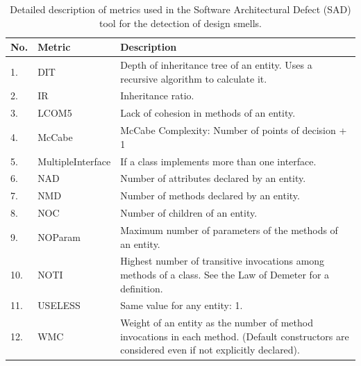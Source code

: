 \documentclass[AMA,Times1COL]{WileyNJDv5} %
\begin{document}
\begin{table}[h]
	\caption{Detailed description of metrics used in the Software Architectural Defect (SAD) tool for the detection of design smells.\label{table:metric}} %
	\centering %
	\begin{tabularx}{\textwidth}{llX}
		\toprule 
		No.& Metric & Description \\ 
		\midrule
		1. & DIT & Depth of inheritance tree of an entity. Uses a recursive algorithm to calculate it. \\ 
		2. & IR & Inheritance ratio.\\ 
		3. & LCOM5 & Lack of cohesion in methods of an entity.\\ 
		4. & McCabe & McCabe Complexity: Number of points of decision + 1 \\ 
		5. & MultipleInterface & If a class implements more than one interface. \\ 
		6. & NAD & Number of attributes declared by an entity. \\ 
		7. & NMD & Number of methods declared by an entity. \\ 
		8. & NOC & Number of children of an entity. \\ 
		9. & NOParam & Maximum number of parameters of the methods of an entity.\\ 
		10. & NOTI & Highest number of transitive invocations among methods of a class. See the Law of Demeter for a definition.\\ 
		11. & USELESS & Same value for any entity: 1.\\ 
		12. & WMC & Weight of an entity as the number of method invocations in each method. (Default constructors are considered even if not explicitly declared).\\
		\bottomrule
	\end{tabularx}
\end{table}
\end{document}
